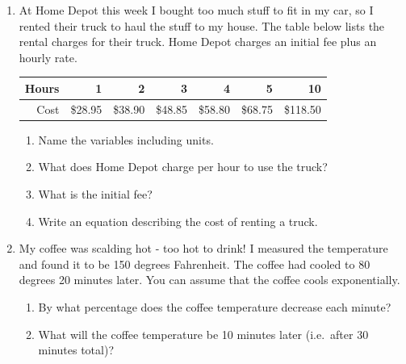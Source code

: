 \documentclass[12pt]{article}
\begin{document}
\begin{enumerate}
\newpage %

\item At Home Depot this week I bought too much stuff to fit in my car, so I rented their truck to haul the stuff to my house.  The table below lists the rental charges for their truck.  Home Depot charges an initial fee plus an hourly rate.

\begin{center}
\begin{tabular} {|r|r|r|r|r|r|r|} \hline
Hours & 1 & 2 & 3 & 4 & 5 & 10 \\ \hline
Cost & \$28.95 & \$38.90 & \$48.85 & \$58.80 & \$68.75 & \$118.50 \\ \hline
\end{tabular}
\end{center}

\begin{enumerate}
\item Name the variables including units.
\vfill
\item What does Home Depot charge per hour to use the truck?
\vfill
\item What is the initial fee?
\vfill
\item Write an equation describing the cost of renting a truck.
\vfill
\end{enumerate}

\newpage %

\item My coffee was scalding hot - too hot to drink!  I measured the temperature and found it to be 150 degrees Fahrenheit.  The coffee had cooled to 80 degrees 20 minutes later.  You can assume that the coffee cools exponentially.

\begin{enumerate}
\item By what percentage does the coffee temperature decrease each minute?
\vfill
\item What will the coffee temperature be 10 minutes later (i.e.\ after 30 minutes total)?
\vfill
\end{enumerate}



\end{enumerate}
\end{document}
